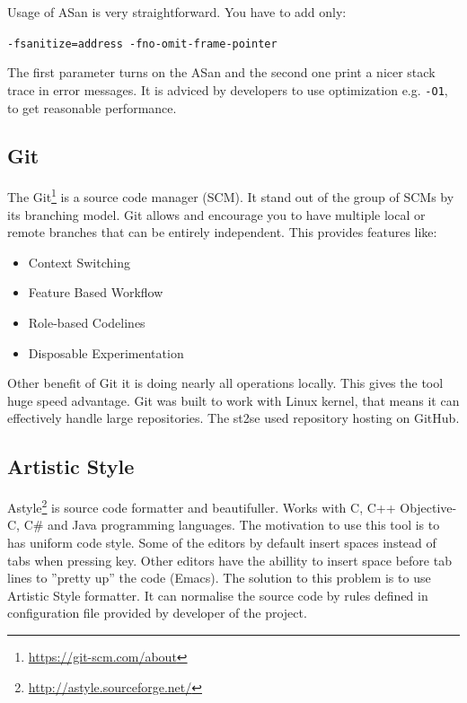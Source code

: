 Usage of ASan is very straightforward. You have to add only:\\
\begin{center}
	\texttt{-fsanitize=address -fno-omit-frame-pointer}
\end{center}
The first parameter turns on the ASan and the second one print a nicer stack trace in error messages.
It is adviced by developers to use optimization e.g. \texttt{-O1}, to get reasonable performance.

\subsection{Git}
The Git\footnote{\url{https://git-scm.com/about}} is a source code manager (SCM). It stand out of the group of SCMs by its branching model.
Git allows and encourage you to have multiple local or remote branches that can be entirely independent.
This provides features like:
\begin{itemize}
	\item Context Switching
	\item Feature Based Workflow
	\item Role-based Codelines
	\item Disposable Experimentation
\end{itemize}
Other benefit of Git it is doing nearly all operations locally.
This gives the tool huge speed advantage.
Git was built to work with Linux kernel, that means it can effectively handle large repositories.
The st2se used repository hosting on GitHub.

\subsection{Artistic Style}
Astyle\footnote{\url{http://astyle.sourceforge.net/}} is  source code formatter and beautifuller.
Works with C, C++ Objective-C, C\# and Java programming languages.
The motivation to use this tool is to has uniform code style.
Some of the editors by default insert spaces instead of tabs when pressing key.
Other editors have the abillity to insert space before tab lines to ''pretty up'' the code (Emacs).
The solution to this problem is to use Artistic Style formatter.
It can normalise the source code by rules defined in configuration file provided by developer of the project.

